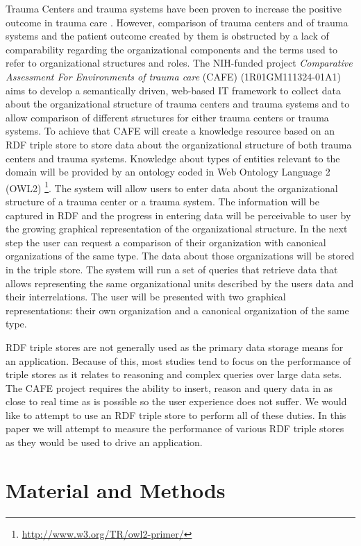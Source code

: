 \documentclass{llncs}
\begin{document}
Trauma Centers and trauma systems have been proven to increase the positive outcome in trauma care \cite{pmid16427544, pmid21206286, pmid26151508}. However, comparison of trauma centers and of trauma systems and the patient outcome created by them is obstructed by a lack of comparability regarding the organizational components and the terms used to refer to organizational structures and roles. The NIH-funded project \textit{Comparative Assessment For Environments of trauma care} (CAFE) (1R01GM111324-01A1)  aims to develop a semantically driven, web-based IT framework to collect data about the organizational structure of trauma centers and trauma systems and to allow comparison of different structures for either trauma centers or trauma systems. To achieve that CAFE will create a knowledge resource based on an RDF triple store to store data about the organizational structure of both trauma centers and trauma systems. Knowledge about types of entities relevant to the domain will be provided by an ontology coded in Web Ontology Language 2 (OWL2) \footnote{\url{http://www.w3.org/TR/owl2-primer/}}. The system will allow users to enter data about the organizational structure of a trauma center or a trauma system. The information will be captured in RDF and the progress in entering data will be perceivable to user by the growing graphical representation of the organizational structure. In the next step the user can request a comparison of their organization with canonical organizations of the same type. The data about those organizations will be stored in the triple store. The system will run a set of queries that retrieve data that allows representing the same organizational units described by the users data and their interrelations. The user will be presented with two graphical representations: their own organization and a canonical organization of the same type.

RDF triple stores are not generally used as the primary data storage means for an application.  Because of this, most studies tend to focus on the performance of triple stores as it relates to reasoning and complex queries over large data sets.  The CAFE project requires the ability to insert, reason and query data in as close to real time as is possible so the user experience does not suffer.  We would like to attempt to use an RDF triple store to perform all of these duties.  In this paper we will attempt to measure the performance of various RDF triple stores as they would be used to drive an application.

\section{Material and Methods}
\end{document}
